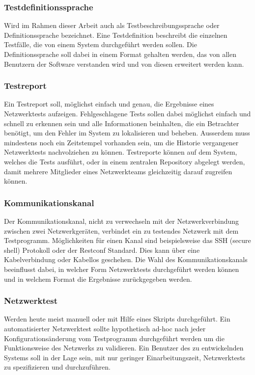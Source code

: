 \documentclass[]{subfiles}
\begin{document}
    \subsubsection*{Testdefinitionssprache}
    Wird im Rahmen dieser Arbeit auch als Testbeschreibungssprache oder Definitionssprache
    bezeichnet. Eine Testdefinition beschreibt die einzelnen Testfälle, die von einem
    System durchgeführt werden sollen.
    Die Definitionssprache soll dabei in einem Format gehalten werden, das von 
    allen Benutzern der Software verstanden wird und von diesen erweitert werden kann.

    \subsubsection*{Testreport}
    Ein Testreport soll, möglichst einfach und genau, die Ergebnisse eines 
    Netzwerktests aufzeigen. 
    Fehlgeschlagene Tests sollen dabei möglichst einfach und schnell zu erkennen
    sein und alle Informationen beinhalten, die ein Betrachter benötigt, um
    den Fehler im System zu lokalisieren und beheben.
    Ausserdem muss mindestens noch ein Zeitstempel vorhanden sein, um die
    Historie vergangener Netzwerktests nachvolziehen zu können.
    Testreporte können auf dem System, welches die Tests ausführt, oder in 
    einem zentralen Repository abgelegt werden, damit mehrere Mitglieder eines 
    Netzwerkteams gleichzeitig darauf zugreifen können.     

    \subsubsection*{Kommunikationskanal}
    Der Kommunikationskanal, nicht zu verwechseln mit der Netzwerkverbindung zwischen
    zwei Netzwerkgeräten, verbindet ein zu testendes Netzwerk mit dem Testprogramm.
    Möglichkeiten für einen Kanal sind beispielsweise das SSH (secure shell) Protokoll
    oder der Restconf Standard.
    Dies kann über eine Kabelverbindung oder Kabellos geschehen.
    Die Wahl des Kommunikationskanals beeinflusst dabei, in welcher Form 
    Netzwerktests durchgeführt werden können und in welchem Format die Ergebnisse 
    zurückgegeben werden.

    \subsubsection*{Netzwerktest}
    Werden heute meist manuell oder mit Hilfe eines Skripts durchgeführt.
    Ein automatisierter Netzwerktest sollte hypothetisch ad-hoc nach jeder
    Konfigurationsänderung vom Testprogramm durchgeführt werden um 
    die Funktionsweise des Netzwerks zu validieren. 
    Ein Benutzer des zu entwickelnden Systems soll in der Lage sein, 
    mit nur geringer Einarbeitungszeit, Netzwerktests zu spezifizieren und
    durchzuführen.
\end{document}
